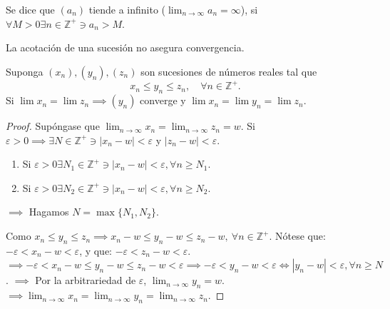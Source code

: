 \begin{definicion}
	Se dice que $(a_n)$ tiende a infinito ($\lim_{n\to\infty}a_n=\infty$), si $\forall M>0\exists n\in\mathbb{Z}^+\ni a_n>M$. 
	\begin{nota}
		La acotación de una sucesión no asegura convergencia. 
	\end{nota}
\end{definicion}

\begin{teorema}
	Suponga $(x_n), (y_n), (z_n)$ son sucesiones de números reales tal que 
	$$x_n\leq y_n\leq z_n, \quad \forall n\in \mathbb{Z}^+.$$
	Si $\lim x_n=\lim z_n\implies (y_n)$ converge y $\lim x_n =\lim y_n=\lim z_n$. 
\end{teorema}

\begin{proof}
 Supóngase que $\lim_{n\to\infty}x_n=\lim_{n\to\infty}z_n=w$. Si $\varepsilon>0\implies \exists N\in \mathbb{Z}^+\ni |x_n-w|<\varepsilon$ y $|z_n-w|<\varepsilon$. 
 \begin{cajita}
 	\begin{enumerate}
 		\item Si $\varepsilon>0\exists N_1\in \mathbb{Z}^+\ni |x_n-w|<\varepsilon, \forall n\geq N_1$. 
 		\item Si $\varepsilon>0\exists N_2\in \mathbb{Z}^+\ni |x_n-w|<\varepsilon, \forall n\geq N_2$. 
 	\end{enumerate}
 $\implies$ Hagamos $N=\max\{N_1,N_2\}$. 
 \end{cajita}
Como $x_n\leq y_n\leq z_n\implies x_n-w\leq y_n-w\leq z_n-w, \ \forall n\in\mathbb{Z}^+$. Nótese que: $-\varepsilon<x_n-w<\varepsilon$, y que: $-\varepsilon<z_n-w<\varepsilon$. $\implies -\varepsilon<x_n-w\leq y_n-w\leq z_n-w<\varepsilon\implies -\varepsilon<y_n-w<\varepsilon \iff |y_n-w|<\varepsilon, \forall n\geq N$. $\implies$ Por la arbitrariedad de $\varepsilon$, $\lim_{n\to\infty}y_n=w$. $\implies \lim_{n\to\infty}x_n=\lim_{n\to\infty}y_n=\lim_{n\to\infty}z_n$. 
\end{proof}

